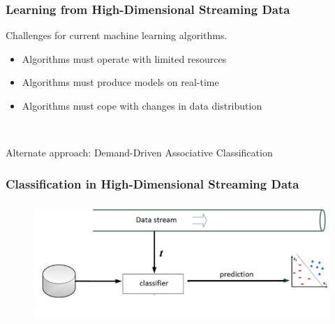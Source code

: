 \documentclass{beamer}
\begin{document}
\begin{frame}\frametitle{Learning from High-Dimensional Streaming Data}

Challenges for current machine learning algorithms.

\begin{itemize}
\item Algorithms must operate with limited resources
\item Algorithms must produce models on real-time
\item Algorithms must cope with changes in data distribution
\end{itemize}

\pause

~

Alternate approach: \alert{Demand-Driven Associative Classification}

\end{frame}

\begin{frame}\frametitle{Classification in High-Dimensional Streaming Data}

\begin{figure}
\centering
\includegraphics[height=1.80in]{stream2.eps}
\end{figure}

\end{frame}
\end{document}
